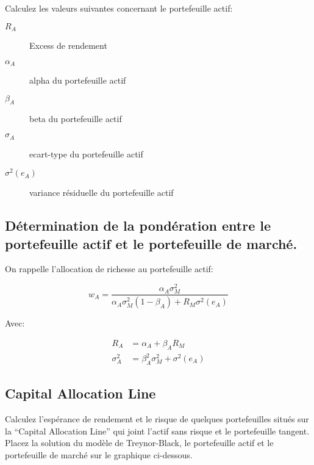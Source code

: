\documentclass[
]{article}
\begin{document}
Calculez les valeurs suivantes concernant le portefeuille actif:

\begin{description}
\item[$R_A$] Excess de rendement
\item[$\alpha_A$] alpha du portefeuille actif
\item[$\beta_A$]  beta du portefeuille actif
\item[$\sigma_A$] ecart-type du portefeuille actif
\item[$\sigma^2(e_A)$] variance résiduelle du portefeuille actif

\end{description}

\hypertarget{duxe9termination-de-la-ponduxe9ration-entre-le-portefeuille-actif-et-le-portefeuille-de-marchuxe9.}{%
\subsection{Détermination de la pondération entre le portefeuille actif
et le portefeuille de
marché.}\label{duxe9termination-de-la-ponduxe9ration-entre-le-portefeuille-actif-et-le-portefeuille-de-marchuxe9.}}

On rappelle l'allocation de richesse au portefeuille actif:

\[
w_A = \frac{\alpha_A \sigma^2_M}{\alpha_A \sigma^2_M (1-\beta_A) + R_M \sigma^2(e_A)}
\]

Avec:

\[
\begin{aligned}
R_A & = \alpha_A + \beta_A R_M \\
\sigma^2_A & = \beta^2_A \sigma^2_M + \sigma^2(e_A)
\end{aligned}
\]

\hypertarget{capital-allocation-line}{%
\subsection{Capital Allocation Line}\label{capital-allocation-line}}

Calculez l'espérance de rendement et le risque de quelques portefeuilles
situés sur la ``Capital Allocation Line'' qui joint l'actif sans risque
et le portefeuille tangent. Placez la solution du modèle de
Treynor-Black, le portefeuille actif et le portefeuille de marché sur le
graphique ci-dessous.
\end{document}

